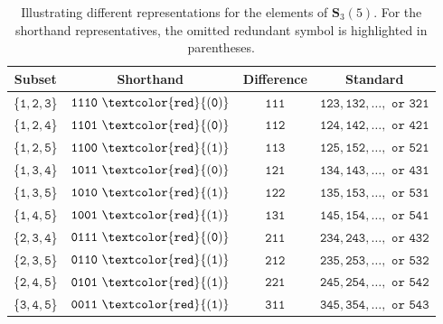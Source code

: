 \documentclass[US-letter,USenglish,authorcolumns,autoref]{lipics-v2021}
\renewcommand{\tt} {\mathtt}
\newenvironment{frshaded*}{%
    \def\FrameCommand{\fboxrule=\FrameRule\fboxsep=\FrameSep \fcolorbox{lipicsYellow}{shadecolor}}%
    \MakeFramed {\advance\hsize-\width \FrameRestore}}%
    {\endMakeFramed}
\newcounter{examplecounter}
\newenvironment{exam}{
 \begin{frshaded*}
    \refstepcounter{examplecounter}%
    \noindent
  \textbf{Example \arabic{examplecounter}}%
  \quad
}{%
\end{frshaded*}
}
\begin{document}
%
\begin{table}[h] 
    \centering
    \begin{tabular}{c|c|c|c}
        \multicolumn{1}{c|}{\bf Subset} & \multicolumn{1}{c|}{\bf Shorthand} & \multicolumn{1}{c|}{\bf Difference} & \multicolumn{1}{c}{\bf Standard}  \\
        \hline
        \{$\tt{1,2,3}$\}  & $\tt{1110~\textcolor{red}{(0)}}$ & $\tt{111}$ & $\tt{123, 132, \ldots, \mbox{ or } 321}$ \\
        \{$\tt{1,2,4}$\}  & $\tt{1101~\textcolor{red}{(0)}}$ & $\tt{112}$ & $\tt{124, 142, \ldots, \mbox{ or } 421}$\\
        \{$\tt{1,2,5}$\}  & $\tt{1100~\textcolor{red}{(1)}}$ & $\tt{113}$ & $\tt{125, 152, \ldots, \mbox{ or } 521}$\\
        \{$\tt{1,3,4}$\}  & $\tt{1011~\textcolor{red}{(0)}}$ & $\tt{121}$ & $\tt{134, 143, \ldots, \mbox{ or } 431}$\\
        \{$\tt{1,3,5}$\}  & $\tt{1010~\textcolor{red}{(1)}}$ & $\tt{122}$ & $\tt{135, 153, \ldots, \mbox{ or } 531}$\\
        \{$\tt{1,4,5}$\}  & $\tt{1001~\textcolor{red}{(1)}}$ & $\tt{131}$& $\tt{145, 154, \ldots, \mbox{ or } 541}$\\
        \{$\tt{2,3,4}$\}  & $\tt{0111~\textcolor{red}{(0)}}$ &  $\tt{211}$& $\tt{234, 243, \ldots, \mbox{ or } 432}$\\
        \{$\tt{2,3,5}$\}  & $\tt{0110~\textcolor{red}{(1)}}$ &  $\tt{212}$& $\tt{235, 253, \ldots, \mbox{ or } 532}$ \\
        \{$\tt{2,4,5}$\}  & $\tt{0101~\textcolor{red}{(1)}}$ &  $\tt{221}$& $\tt{245, 254, \ldots, \mbox{ or } 542}$ \\
        \{$\tt{3,4,5}$\}  & $\tt{0011~\textcolor{red}{(1)}}$ &  $\tt{311}$& $\tt{345, 354, \ldots, \mbox{ or } 543}$ \\
    
    \end{tabular}
    \caption{Illustrating different representations for the elements of $\mathbf{S}_3(5)$. For the shorthand representatives, the omitted redundant symbol is highlighted in parentheses.} 
    \label{tab:reps}
\end{table}

\end{document}
